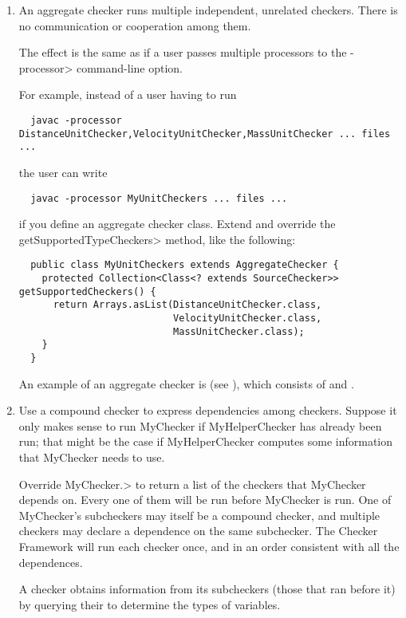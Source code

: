 \begin{enumerate}
\item
An aggregate checker runs multiple independent, unrelated checkers.  There
is no communication or cooperation among them.

The effect is the same as if a user passes
multiple processors to the \<-processor> command-line option.

For example, instead of a user having to run

\begin{Verbatim}
  javac -processor DistanceUnitChecker,VelocityUnitChecker,MassUnitChecker ... files ...
\end{Verbatim}

\noindent
the user can write

\begin{Verbatim}
  javac -processor MyUnitCheckers ... files ...
\end{Verbatim}

\noindent
if you define an aggregate checker class.  Extend  and override
the \<getSupportedTypeCheckers> method, like the following:

\begin{Verbatim}
  public class MyUnitCheckers extends AggregateChecker {
    protected Collection<Class<? extends SourceChecker>> getSupportedCheckers() {
      return Arrays.asList(DistanceUnitChecker.class,
                           VelocityUnitChecker.class,
                           MassUnitChecker.class);
    }
  }
\end{Verbatim}

An example of an aggregate checker is 
(see ), which consists of
 and
.

\item
Use a compound checker to express dependencies among checkers.  Suppose it
only makes sense to run MyChecker if MyHelperChecker has already been run;
that might be the case if MyHelperChecker computes some information that
MyChecker needs to use.

Override 
\<MyChecker.>
to return a list of the checkers that MyChecker depends on.  Every one of
them will be run before MyChecker is run.  One of MyChecker's subcheckers
may itself be a compound checker, and multiple checkers may declare a
dependence on the same subchecker.  The Checker Framework will run each
checker once, and in an order consistent with all the dependences.

A checker obtains information from its subcheckers (those that ran before
it) by querying their  to
determine the types of variables.

\end{enumerate}



